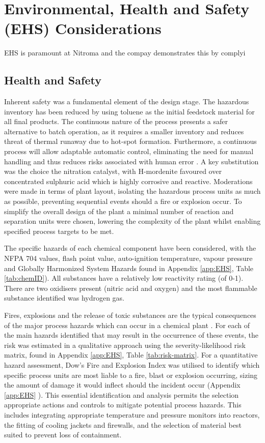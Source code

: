 \section{Environmental, Health and Safety (EHS) Considerations}
\label{sec:ehs}


EHS is paramount at Nitroma and the compay demonstrates this by complyi
\subsection{Health and Safety}
Inherent safety was a fundamental element of the design stage. The hazardous inventory has been reduced by using toluene as the initial feedstock material for all final products. The continuous nature of the process presents a safer alternative to batch operation, as it requires a smaller inventory and reduces threat of thermal runaway due to hot-spot formation. Furthermore, a continuous process will allow adaptable automatic control, eliminating the need for manual handling and thus reduces risks associated with human error \cite{mannan_lees_2012}. A key substitution was the choice the nitration catalyst, with H-mordenite favoured over concentrated sulphuric acid which is highly corrosive and reactive. Moderations were made in terms of plant layout, isolating the hazardous process units as much as possible, preventing sequential events should a fire or explosion occur. To simplify the overall design of the plant a minimal number of reaction and separation units were chosen, lowering the complexity of the plant whilst enabling specified process targets to be met. 

The specific hazards of each chemical component have been considered, with the NFPA 704 values, flash point value, auto-ignition temperature, vapour pressure and Globally Harmonized System Hazards found in Appendix \ref{app:EHS}, Table \ref{tab:chemID}). All substances have a relatively low reactivity rating (of 0-1). There are two oxidisers present (nitric acid and oxygen) and the most flammable substance identified was hydrogen gas.  

Fires, explosions and the release of toxic substances are the typical consequences of the major process hazards which can occur in a chemical plant \cite{mannan_lees_2012}. For each of the main hazards identified that may result in the occurrence of these events, the risk was estimated in a qualitative approach using the severity-likelihood risk matrix, found in Appendix \ref{app:EHS}, Table \ref{tab:risk-matrix}. For a quantitative hazard assessment, Dow's Fire and Explosion Index was utilised to identify which specific process units are most liable to  a fire, blast or explosion occurring, sizing the amount of damage it would inflect should the incident occur (Appendix \ref{app:EHS} ). This essential identification and analysis permits the selection appropriate actions and controls to mitigate potential process hazards. This includes integrating appropriate temperature and pressure monitors into reactors, the fitting of cooling jackets and firewalls, and the selection of material best suited to prevent loss of containment.


